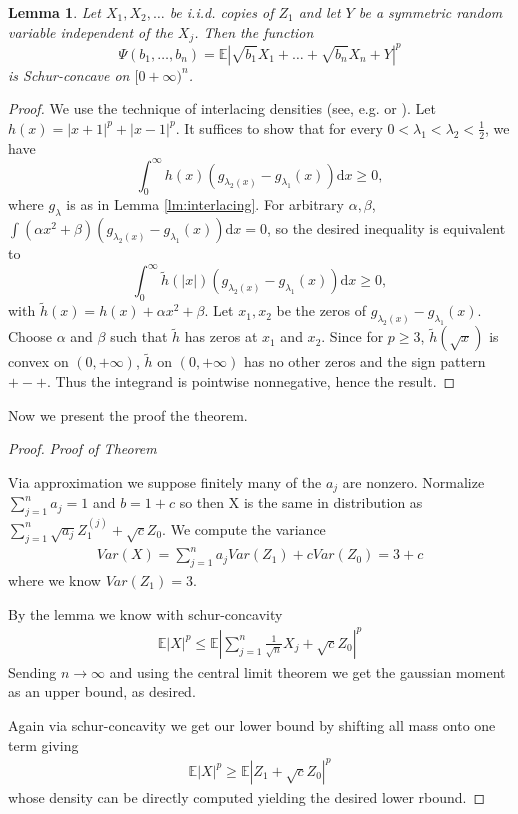 \documentclass[10pt]{article}
\newcommand{\dd}{\mathrm{d}}
\newcommand{\E}{\mathbb{E}}
\newcommand{\1}{\textbf{1}}
\newtheorem{lemma}[theorem]{Lemma}
\theoremstyle{remark}
\theoremstyle{definition}
\begin{document}
\begin{lemma}\label{lm:schur}
Let $X_1, X_2, \dots$ be i.i.d. copies of $Z_1$ and let $Y$ be a symmetric random variable independent of the $X_j$. Then the function
\[
\Psi(b_1,\dots,b_n) = \E|\sqrt{b_1}X_1+\dots+\sqrt{b_n}X_n + Y|^p
\]
is Schur-concave on $[0+\infty)^n$.
\end{lemma}
\begin{proof}
We use the technique of interlacing densities (see, e.g. \cite{ENT2} or \cite{NZ}). Let $h(x) = |x+1|^p+|x-1|^p$. It suffices to show that for every $0 < \lambda_1 < \lambda_2 < \frac{1}{2}$, we have
\[
\int_0^\infty h(x)(g_{\lambda_2(x)} - g_{\lambda_1}(x)) \dd x \geq 0,
\]
where $g_\lambda$ is as in Lemma \ref{lm:interlacing}. For arbitrary $\alpha, \beta$, $\int (\alpha x^2+\beta)(g_{\lambda_2(x)} - g_{\lambda_1}(x)) \dd x = 0$, so the desired inequality is equivalent to 
\[
\int_0^\infty \tilde h(|x|)(g_{\lambda_2(x)} - g_{\lambda_1}(x)) \dd x \geq 0,
\]
with $\tilde h(x) = h(x) + \alpha x^2 + \beta$. Let $x_1, x_2$ be the zeros of $g_{\lambda_2(x)} - g_{\lambda_1}(x)$. Choose $\alpha$ and $\beta$ such that $\tilde h$ has zeros at $x_1$ and $x_2$. Since for $p \geq 3$, $\tilde h(\sqrt{x})$ is convex on $(0,+\infty)$, $\tilde h$ on $(0,+\infty)$ has no other zeros and the sign pattern $+-+$. Thus the integrand is pointwise nonnegative, hence the result.
\end{proof}

Now we present the proof the theorem.

\begin{proof}\textit{Proof of Theorem}


	Via approximation we suppose finitely many of the $a_j$ are nonzero. Normalize $\sum_{j=1}^n a_j = 1$ and $b = 1+c$ so then X is the same in distribution as $\sum_{j=1}^n \sqrt{a_j}Z_1^{(j)} + \sqrt{c}Z_0$. We compute the variance
	\begin{align*}
		Var(X) = \sum_{j=1}^na_jVar(Z_1) + cVar(Z_0) = 3+c
	\end{align*}
	where we know $Var(Z_1) = 3$. 

	By the lemma we know with schur-concavity
	\begin{align*}
		\E |X|^p \leq \E|\sum_{j=1}^n \frac{1}{\sqrt{n}} X_j + \sqrt{c}Z_0|^p
	\end{align*}
	Sending $n \to \infty$ and using the central limit theorem we get the gaussian moment as an upper bound, as desired. 

	Again via schur-concavity we get our lower bound by shifting all mass onto one term giving
	\begin{align*}
		\E |X|^p \geq \E |Z_1 + \sqrt{c}Z_0|^p
	\end{align*}
	whose density can be directly computed yielding the desired lower rbound.
\end{proof}
\end{document}
